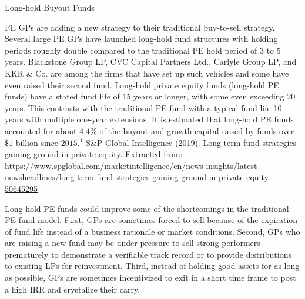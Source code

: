 \documentclass[11pt]{article}
\begin{document}
Long-hold Buyout Funds

PE GPs are adding a new strategy to their traditional buy-to-sell strategy. Several large PE GPs have launched long-hold fund structures with holding periods roughly double compared to the traditional PE hold period of 3 to 5 years. Blackstone Group LP, CVC Capital Partners Ltd., Carlyle Group LP, and KKR \& Co. are among the firms that have set up such vehicles and some have even raised their second fund. Long-hold private equity funds (long-hold PE funds) have a stated fund life of 15 years or longer, with some even exceeding 20 years. This contrasts with the traditional PE fund with a typical fund life 10 years with multiple one-year extensions. It is estimated that long-hold PE funds accounted for about $4.4 \%$ of the buyout and growth capital raised by funds over $\$ 1$ billion since $2015 .^{1}$ S\&P Global Intelligence (2019). Long-term fund strategies gaining ground in private equity. Extracted from: \href{https://www.spglobal.com/marketintelligence/en/news-insights/latest-newsheadlines/long-term-fund-strategies-gaining-ground-in-private-equity-50645295}{https://www.spglobal.com/marketintelligence/en/news-insights/latest-newsheadlines/long-term-fund-strategies-gaining-ground-in-private-equity-50645295}

Long-hold PE funds could improve some of the shortcomings in the traditional PE fund model. First, GPs are sometimes forced to sell because of the expiration of fund life instead of a business rationale or market conditions. Second, GPs who are raising a new fund may be under pressure to sell strong performers prematurely to demonstrate a verifiable track record or to provide distributions to existing LPs for reinvestment. Third, instead of holding good assets for as long as possible, GPs are sometimes incentivized to exit in a short time frame to post a high IRR and crystalize their carry.
\end{document}

